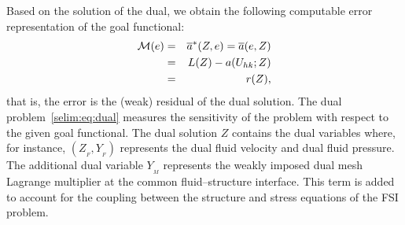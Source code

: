 Based on the solution of the dual, we obtain the following computable
error representation of the goal functional:
\begin{eqnarray}
\label{selim:eq:representation}
\nonumber
\mathcal{M}(e) &=& \overline{a}^{*}(Z ,e) = \overline{a}(e, Z)\\ &=& L(Z) - a(
U_{hk}; Z)\\
\nonumber
&=& r(Z),
\end{eqnarray}
that is, the error is the (weak) residual of the dual solution.  The
dual problem~\eqref{selim:eq:dual} measures the sensitivity of the
problem with respect to the given goal functional. The dual solution
$Z$ contains the dual variables where, for instance, $(Z_{_{F}},
Y_{_{F}})$ represents the dual fluid velocity and dual fluid pressure.
The additional dual variable $Y_{_{M}}$ represents the weakly imposed
dual mesh Lagrange multiplier at the common fluid--structure
interface.  This term is added to account for the coupling between the
structure and stress equations of the FSI problem.

